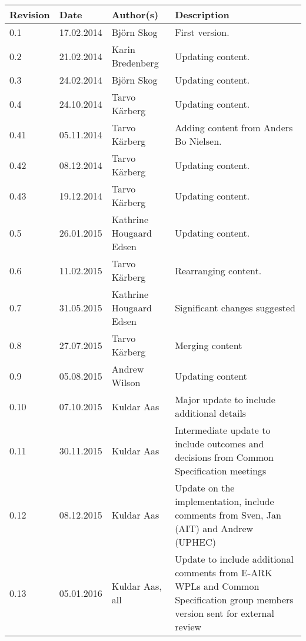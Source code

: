 \begin{tabular}{|p{}|p{}|p{4cm}|p{7cm}|}
\hline
\textbf{Revision} & \textbf{Date} & \textbf{Author(s)} & \textbf{Description}                                                  \\
\hline
0.1   & 17.02.2014 & Björn Skog                   & First version.                                                              \\
\hline
0.2   & 21.02.2014 & Karin Bredenberg             & Updating content.                          \\
\hline
0.3   & 24.02.2014 & Björn Skog                   & Updating content.                          \\
\hline
0.4   & 24.10.2014 & Tarvo Kärberg                & Updating content.                          \\
\hline
0.41   & 05.11.2014 & Tarvo Kärberg               & Adding content from Anders Bo Nielsen.     \\
\hline
0.42   & 08.12.2014 & Tarvo Kärberg               & Updating content.                          \\
\hline
0.43   & 19.12.2014 & Tarvo Kärberg               & Updating content.                          \\
\hline
0.5   & 26.01.2015 & Kathrine Hougaard Edsen      & Updating content.                          \\
\hline
0.6   & 11.02.2015 & Tarvo Kärberg                & Rearranging content.                       \\
\hline
0.7   & 31.05.2015 & Kathrine Hougaard Edsen      & Significant changes suggested              \\
\hline
0.8   & 27.07.2015 & Tarvo Kärberg                & Merging content                            \\
\hline
0.9   & 05.08.2015 & Andrew Wilson                & Updating content                           \\
\hline
0.10   & 07.10.2015 & Kuldar Aas                  & Major update to include additional details \\
\hline
0.11   & 30.11.2015 & Kuldar Aas                  & Intermediate update to include outcomes and decisions from Common Specification meetings \\
\hline
0.12   & 08.12.2015 & Kuldar Aas                  & Update on the implementation, include comments from Sven, Jan (AIT) and Andrew (UPHEC) \\
\hline
0.13   & 05.01.2016 & Kuldar Aas, all             & Update to include additional comments from E-ARK WPLs and Common Specification group members version sent for external review \\

\end{tabular}
